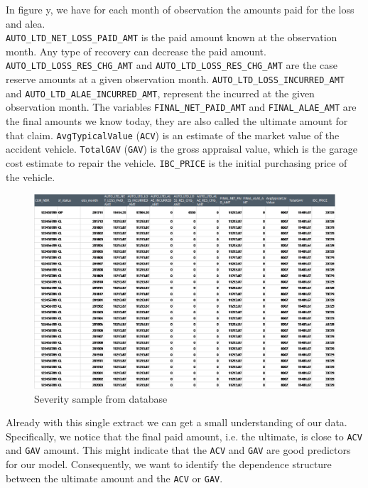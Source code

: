 	In figure y, we have for each month of observation the amounts paid for the loss and alea.\\
	\texttt{AUTO\_LTD\_NET\_LOSS\_PAID\_AMT} is the paid amount known at the observation month. Any type of recovery can decrease the paid amount. \texttt{AUTO\_LTD\_LOSS\_RES\_CHG\_AMT} and \texttt{AUTO\_LTD\_LOSS\_RES\_CHG\_AMT} are the case reserve amounts at a given observation month. \texttt{AUTO\_LTD\_LOSS\_INCURRED\_AMT} and \texttt{AUTO\_LTD\_ALAE\_INCURRED\_AMT}, represent the incurred at the given observation month. The variables \texttt{FINAL\_NET\_PAID\_AMT} and \texttt{FINAL\_ALAE\_AMT} are the final amounts we know today, they are also called the ultimate amount for that claim. \texttt{AvgTypicalValue} (\texttt{ACV}) is an estimate of the market value of the accident vehicle. \texttt{TotalGAV} (\texttt{GAV}) is the gross appraisal value, which is the garage cost estimate to repair the vehicle. \texttt{IBC\_PRICE} is the initial purchasing price of the vehicle.\\
	\begin{figure}[H]
		\begin{center}
			\includegraphics[scale=0.4]{Graphiques/sample_2} 
			\renewcommand{\figurename}{Figure}
			\caption{Severity sample from database}\label{Fig_sample_2}
		\end{center}
	\end{figure}

	Already with this single extract we can get a small understanding of our data. Specifically, we notice that the final paid amount, i.e. the ultimate, is close to \texttt{ACV} and \texttt{GAV} amount. This might indicate that the \texttt{ACV} and \texttt{GAV} are good predictors for our model. Consequently, we want to identify the dependence structure between the ultimate amount and the \texttt{ACV} or \texttt{GAV}. \\
	
